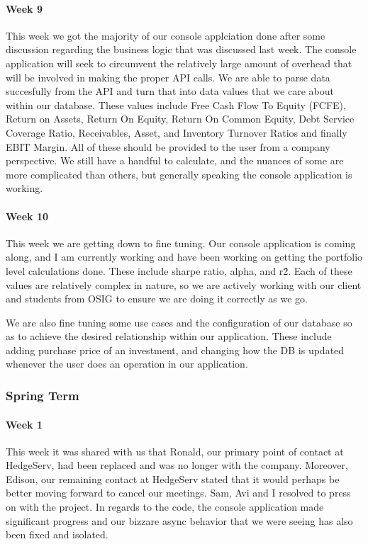 \documentclass[onecolumn, draftclsnofoot,10pt, compsoc]{IEEEtran}
\begin{document}
\paragraph{Week 9}
This week we got the majority of our console applciation done after some discussion regarding the business logic that was discussed last week. The console application will seek to circumvent the relatively large amount of overhead that will be involved in making the proper API calls. We are able to parse data succesfully from the API and turn that into data values that we care about within our database. These values include Free Cash Flow To Equity (FCFE), Return on Assets, Return On Equity, Return On Common Equity, Debt Service Coverage Ratio, Receivables, Asset, and Inventory Turnover Ratios and finally EBIT Margin. 
All of these should be provided to the user from a company perspective. We still have a handful to calculate, and the nuances of some are more complicated than others, but generally speaking the console application is working. 
\paragraph{Week 10}
This week we are getting down to fine tuning. Our console application is coming along, and I am currently working and have been working on getting the portfolio level calculations done. These  include sharpe ratio, alpha, and r\^2. Each of these values are relatively complex in nature, so we are actively working with our client and students from OSIG to ensure we are doing it correctly as we go.  
 
We are also fine tuning some use cases and the configuration of our database so as to achieve the desired relationship within our application. These include adding purchase price of an investment, and changing how the DB is updated whenever the user does an operation in our application. 

\subsubsection{Spring Term}
\paragraph{Week 1}
This week it was shared with us that Ronald, our primary point of contact at HedgeServ, had been replaced and was no longer with the company. Moreover, Edison, our remaining contact at HedgeServ stated that it would perhaps be better moving forward to cancel our meetings. Sam, Avi and I resolved to press on with the project. In regards to the code, the console application made significant progress and our bizzare async behavior that we were seeing has also been fixed and isolated. 
\end{document}
